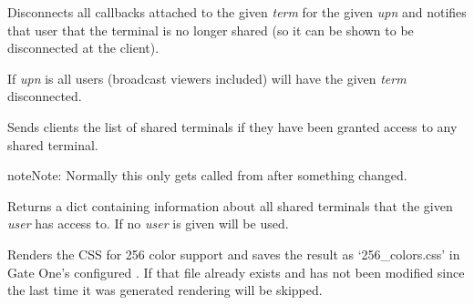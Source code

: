 \documentclass[letterpaper,10pt,openany]{sphinxmanual}
\begin{document}
\begin{fulllineitems}
\begin{fulllineitems}
\label{Applications/terminal/app_terminal:app_terminal.TerminalApplication.remove_viewer}
Disconnects all callbacks attached to the given \emph{term} for the given
\emph{upn} and notifies that user that the terminal is no longer shared (so
it can be shown to be disconnected at the client).

If \emph{upn} is  all users (broadcast viewers included) will have the
given \emph{term} disconnected.

\end{fulllineitems}


\begin{fulllineitems}
\label{Applications/terminal/app_terminal:app_terminal.TerminalApplication.notify_permissions}
Sends clients the list of shared terminals if they have been granted
access to any shared terminal.

\begin{notice}{note}{Note:}
Normally this only gets called from
 after something changed.
\end{notice}

\end{fulllineitems}


\begin{fulllineitems}
\label{Applications/terminal/app_terminal:app_terminal.TerminalApplication._shared_terminals_dict}
Returns a dict containing information about all shared terminals that
the given \emph{user} has access to.  If no \emph{user} is given
 will be used.

\end{fulllineitems}


\begin{fulllineitems}
\label{Applications/terminal/app_terminal:app_terminal.TerminalApplication.render_256_colors}
Renders the CSS for 256 color support and saves the result as
`256\_colors.css' in Gate One's configured .  If that file
already exists and has not been modified since the last time it was
generated rendering will be skipped.


\end{fulllineitems}
\end{fulllineitems}
\end{document}
